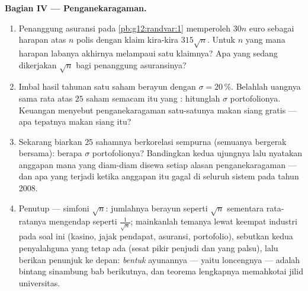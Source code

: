 \begin{problem}
\medskip
\noindent\textbf{Bagian IV --- Penganekaragaman.}
\begin{enumerate}[resume]
  \item Penanggung asuransi pada \cref{pb:g12:randvar:1} memperoleh
        $30n$ euro sebagai harapan atas $n$ polis dengan
         klaim kira-kira $315\sqrt n$. Untuk
        $n$ yang mana harapan labanya akhirnya melampaui satu
         klaimnya? Apa yang sedang dikerjakan
        $\sqrt n$ bagi penanggung asuransinya?
  \item Imbal hasil tahunan satu saham berayun dengan
        $\sigma = 20\,\%$. Belahlah uangnya sama rata atas $25$
        saham semacam itu yang \emph{}: hitunglah
        $\sigma$ portofolionya. Keuangan menyebut penganekaragaman
        satu-satunya makan siang gratis --- apa tepatnya makan siang itu?
  \item Sekarang biarkan $25$ sahamnya berkorelasi sempurna (semuanya
        bergerak bersama): berapa $\sigma$ portofolionya?
        Bandingkan kedua ujungnya lalu nyatakan anggapan mana
        yang diam-diam disewa setiap alasan penganekaragaman ---
        dan apa yang terjadi ketika anggapan itu gagal di seluruh sistem pada tahun 2008.
  \item Penutup --- simfoni $\sqrt n$: jumlahnya berayun seperti
        $\sqrt n$ sementara rata-ratanya mengendap seperti
        $\frac{1}{\sqrt n}$; mainkanlah temanya lewat keempat
        industri pada soal ini (kasino, jajak pendapat, asuransi,
        portofolio), sebutkan kedua penyalahguna yang tetap ada (sesat
        pikir penjudi dan  yang palsu), lalu berikan
        penunjuk ke depan: \emph{bentuk} ayunannya
        --- yaitu loncengnya --- adalah bintang sinambung bab
        berikutnya, dan teorema lengkapnya memahkotai jilid
        universitas.

\end{enumerate}
\end{problem}
